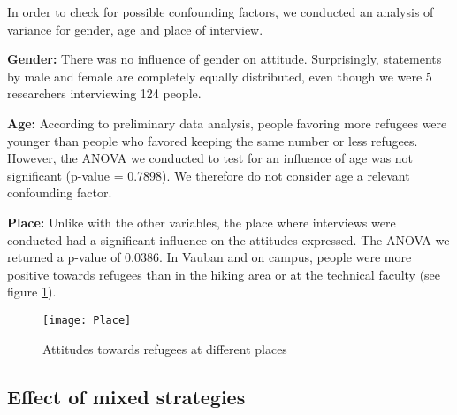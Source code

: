 In order to check for possible confounding factors, we conducted an analysis of variance for gender, age and place of interview.

\textbf{Gender:} There was no influence of gender on attitude. Surprisingly, statements by male and female are completely equally distributed, even though we were 5 researchers interviewing 124 people. 

\textbf{Age:} According to preliminary data analysis, people favoring more refugees were younger than people who favored keeping the same number or less refugees. However, the ANOVA we conducted to test for an influence of age was not significant (p-value = 0.7898). We therefore do not consider age a relevant confounding factor.

\textbf{Place:} Unlike with the other variables, the place where interviews were conducted had a significant influence on the attitudes expressed. The ANOVA we returned a p-value of 0.0386.
In Vauban and on campus, people were more positive towards refugees than in the hiking area or at the technical faculty (see figure \ref{fig: Place}).

\begin{figure}
	\centering 
	\texttt{[image: Place]}
	\caption{Attitudes towards refugees at different places}\label{fig: Place}
\end{figure}


\subsection{Effect of mixed strategies}

